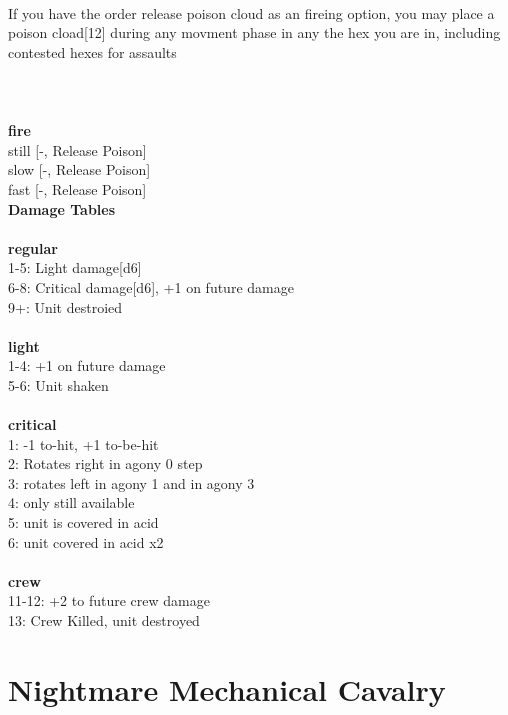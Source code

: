 \ \\
If you have the order release poison cloud as an fireing option, you may place a poison cload[12] during any movment phase in any the hex you are in, including contested hexes for assaults\\ 

\ \\
 
\ \\



\ \\ {\bf fire } \\
still [-, Release Poison] \\
slow [-, Release Poison] \\
fast [-, Release Poison] \\


{\bf Damage Tables} \\
\ \\ {\bf regular } \\
1-5: Light damage[d6] \\
6-8: Critical damage[d6], +1 on future damage \\
9+: Unit destroied \\
\ \\ {\bf light } \\
1-4: +1 on future damage \\
5-6: Unit shaken \\
\ \\ {\bf critical } \\
1: -1 to-hit, +1 to-be-hit \\
2: Rotates right in agony 0 step \\
3: rotates left in agony 1 and in agony 3 \\
4: only still available \\
5: unit is covered in acid \\
6: unit covered in acid x2 \\
\ \\ {\bf crew } \\
11-12: +2 to future crew damage \\
13: Crew Killed, unit destroyed \\










\pagebreak\pagebreak

\section{ Nightmare Mechanical Cavalry }

